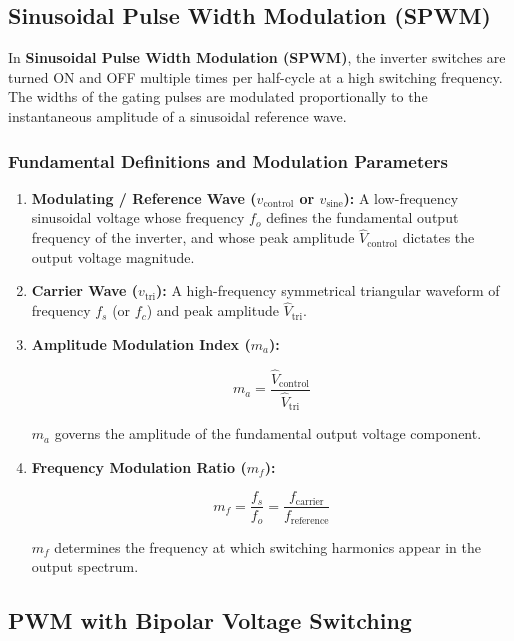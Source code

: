 \documentclass[11pt,a4paper]{article}
\let\origsubsection\subsection
\renewcommand{\subsection}{\Needspace{7\baselineskip}\origsubsection}
\begin{document}
\subsection{Sinusoidal Pulse Width Modulation (SPWM)}

In \textbf{Sinusoidal Pulse Width Modulation (SPWM)}, the inverter switches are turned ON and OFF multiple times per half-cycle at a high switching frequency. The widths of the gating pulses are modulated proportionally to the instantaneous amplitude of a sinusoidal reference wave.

\subsubsection{Fundamental Definitions and Modulation Parameters}
\begin{enumerate}[leftmargin=*]
  \item \textbf{Modulating / Reference Wave ($v_{\text{control}}$ or $v_{\text{sine}}$):} A low-frequency sinusoidal voltage whose frequency $f_o$ defines the fundamental output frequency of the inverter, and whose peak amplitude $\hat{V}_{\text{control}}$ dictates the output voltage magnitude.
  \item \textbf{Carrier Wave ($v_{\text{tri}}$):} A high-frequency symmetrical triangular waveform of frequency $f_s$ (or $f_c$) and peak amplitude $\hat{V}_{\text{tri}}$.
  \item \textbf{Amplitude Modulation Index ($m_a$):}
  \begin{formulabox}
  \begin{equation}
  m_a = \frac{\hat{V}_{\text{control}}}{\hat{V}_{\text{tri}}}
  \label{eq:ma_def}
  \end{equation}
  \end{formulabox}
  $m_a$ governs the amplitude of the fundamental output voltage component.
  \item \textbf{Frequency Modulation Ratio ($m_f$):}
  \begin{formulabox}
  \begin{equation}
  m_f = \frac{f_s}{f_o} = \frac{f_{\text{carrier}}}{f_{\text{reference}}}
  \label{eq:mf_def}
  \end{equation}
  \end{formulabox}
  $m_f$ determines the frequency at which switching harmonics appear in the output spectrum.
\end{enumerate}

\subsection{PWM with Bipolar Voltage Switching}
\end{document}
